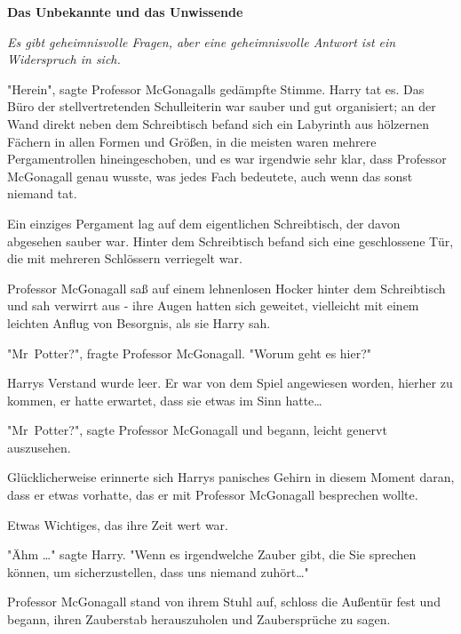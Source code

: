 

\hypertarget{das-unbekannte-und-das-unwissende}{%

\textbf{Das Unbekannte und das Unwissende}

\emph{Es gibt geheimnisvolle Fragen, aber eine geheimnisvolle Antwort ist ein Widerspruch in sich.}

"Herein", sagte Professor McGonagalls gedämpfte Stimme. Harry tat es. Das Büro der stellvertretenden Schulleiterin war sauber und gut organisiert; an der Wand direkt neben dem Schreibtisch befand sich ein Labyrinth aus hölzernen Fächern in allen Formen und Größen, in die meisten waren mehrere Pergamentrollen hineingeschoben, und es war irgendwie sehr klar, dass Professor McGonagall genau wusste, was jedes Fach bedeutete, auch wenn das sonst niemand tat.

Ein einziges Pergament lag auf dem eigentlichen Schreibtisch, der davon abgesehen sauber war. Hinter dem Schreibtisch befand sich eine geschlossene Tür, die mit mehreren Schlössern verriegelt war.

Professor McGonagall saß auf einem lehnenlosen Hocker hinter dem Schreibtisch und sah verwirrt aus - ihre Augen hatten sich geweitet, vielleicht mit einem leichten Anflug von Besorgnis, als sie Harry sah.

"Mr~Potter?", fragte Professor McGonagall. "Worum geht es hier?"

Harrys Verstand wurde leer. Er war von dem Spiel angewiesen worden, hierher zu kommen, er hatte erwartet, dass sie etwas im Sinn hatte…

"Mr~Potter?", sagte Professor McGonagall und begann, leicht genervt auszusehen.

Glücklicherweise erinnerte sich Harrys panisches Gehirn in diesem Moment daran, dass er etwas vorhatte, das er mit Professor McGonagall besprechen wollte.

Etwas Wichtiges, das ihre Zeit wert war.

"Ähm …" sagte Harry. "Wenn es irgendwelche Zauber gibt, die Sie sprechen können, um sicherzustellen, dass uns niemand zuhört…"

Professor McGonagall stand von ihrem Stuhl auf, schloss die Außentür fest und begann, ihren Zauberstab herauszuholen und Zaubersprüche zu sagen.

}
